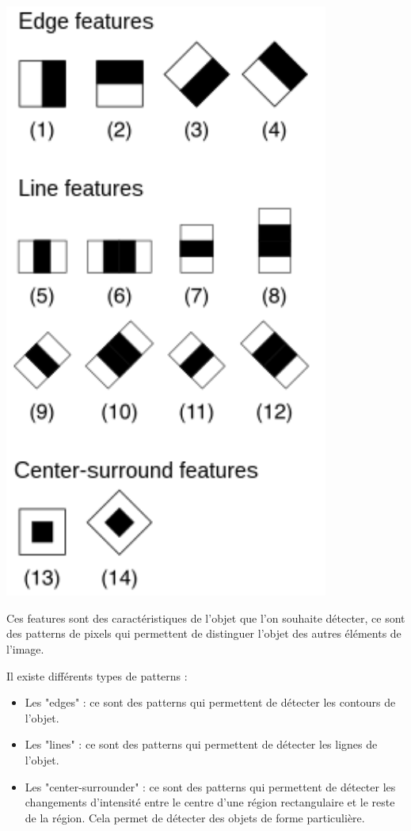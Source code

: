 \documentclass[11pt]{article}
\begin{document}
\begin{minipage}[t]{0.45\textwidth}
    \begin{center}
        \includegraphics[width=0.8\textwidth]{images/haar_feature_2.jpg}
        \label{fig:haar_features_2}
    \end{center}
\end{minipage}

\bigbreak \bigbreak


Ces features sont des caractéristiques de l'objet que l'on souhaite détecter, ce sont des patterns de pixels qui permettent de distinguer l'objet des autres éléments de l'image.

\noindent Il existe différents types de patterns :
\begin{itemize}
    \item Les "edges" : ce sont des patterns qui permettent de détecter les contours de l'objet.
    \item Les "lines" : ce sont des patterns qui permettent de détecter les lignes de l'objet.
    \item Les "center-surrounder" : ce sont des patterns qui permettent de détecter les changements d'intensité entre le centre d'une région rectangulaire et le reste de la région. Cela permet de détecter des objets de forme particulière.
\end{itemize}
\end{document}
